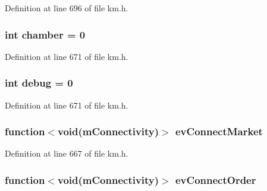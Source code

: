Definition at line 696 of file km.\+h.

\subsubsection[{\texorpdfstring{chamber}{chamber}}]{\setlength{\rightskip}{0pt plus 5cm}int chamber = 0}\hypertarget{class_k_1_1_gw_a8eb87e9b99a80ee81ff9114f6241b8d4}{}\label{class_k_1_1_gw_a8eb87e9b99a80ee81ff9114f6241b8d4}


Definition at line 671 of file km.\+h.

\subsubsection[{\texorpdfstring{debug}{debug}}]{\setlength{\rightskip}{0pt plus 5cm}int debug = 0}\hypertarget{class_k_1_1_gw_ac3e1795766a80ec63b157951b4b9a7d4}{}\label{class_k_1_1_gw_ac3e1795766a80ec63b157951b4b9a7d4}


Definition at line 671 of file km.\+h.

\subsubsection[{\texorpdfstring{ev\+Connect\+Market}{evConnectMarket}}]{\setlength{\rightskip}{0pt plus 5cm}function$<$void({\bf m\+Connectivity})$>$ ev\+Connect\+Market}\hypertarget{class_k_1_1_gw_a9df19921d4fe9fc1aab360b9605fd451}{}\label{class_k_1_1_gw_a9df19921d4fe9fc1aab360b9605fd451}


Definition at line 667 of file km.\+h.

\subsubsection[{\texorpdfstring{ev\+Connect\+Order}{evConnectOrder}}]{\setlength{\rightskip}{0pt plus 5cm}function$<$void({\bf m\+Connectivity})$>$ ev\+Connect\+Order}\hypertarget{class_k_1_1_gw_a2a25d79475922457931affe36df2223f}{}\label{class_k_1_1_gw_a2a25d79475922457931affe36df2223f}


